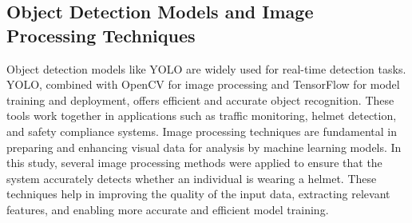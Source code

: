 \begin{refsection}
\subsection{Object Detection Models and Image Processing Techniques}

    Object detection models like YOLO are widely used for real-time detection tasks. YOLO, combined with OpenCV for image processing and TensorFlow for model training and deployment, offers efficient and accurate object recognition. These tools work together in applications such as traffic monitoring, helmet detection, and safety compliance systems.  Image processing techniques are fundamental in preparing and enhancing visual data for analysis by machine learning models. In this study, several image processing methods were applied to ensure that the system accurately detects whether an individual is wearing a helmet. These techniques help in improving the quality of the input data, extracting relevant features, and enabling more accurate and efficient model training.


\end{refsection}
